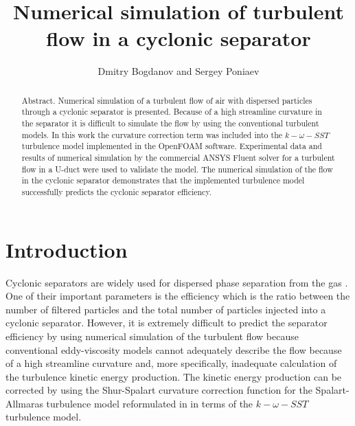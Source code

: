 \documentclass[a4paper]{jpconf}
\begin{document}

\title{Numerical simulation of turbulent flow in a cyclonic separator}

\author{Dmitry Bogdanov and Sergey Poniaev}

\address{Division of Plasma Physics, Atomic Physics and Astrophysics, Ioffe Physical Technical Institute, 26 Polytekhnicheskaya, St Petersburg 194021, Russian Federation}


\begin{abstract}
Abstract. Numerical simulation of a turbulent flow of air with dispersed particles through 
a cyclonic separator is presented. Because of a high streamline curvature in the separator it 
is difficult to simulate the flow by using the conventional turbulent models. In this work the 
curvature correction term was included into the $k-\omega-SST$ turbulence model implemented in 
the OpenFOAM{\textregistered} software. Experimental data and results of numerical simulation by the
commercial ANSYS Fluent{\textregistered} solver for a turbulent flow in a U-duct were used to validate the 
model. The numerical simulation of the flow in the cyclonic separator demonstrates that the 
implemented turbulence model successfully predicts the cyclonic separator efficiency.
\end{abstract}
\section{Introduction}
Cyclonic separators are widely used for dispersed phase separation from the gas \cite{instructions} . One of 
their important parameters is the efficiency which is the ratio between the number of filtered 
particles and the total number of particles injected into a cyclonic separator. However, it is 
extremely difficult to predict the separator efficiency by using numerical simulation of the 
turbulent flow because conventional eddy-viscosity models cannot adequately describe the 
flow \cite{ShurSpallart} because of a high streamline curvature and, more specifically, inadequate calculation  of the turbulence kinetic energy production. The kinetic energy production can be corrected by using the Shur-Spalart curvature correction function for the Spalart-Allmaras turbulence model reformulated in \cite{Smirnov} in terms of the $k-\omega-SST$ turbulence model.
\end{document}
